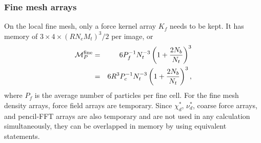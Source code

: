 \documentclass[10pt,twocolumn,reprint]{emulateapj}
\begin{document}
\subsubsection{Fine mesh arrays}
On the local fine mesh, only a force kernel array $K_f$ needs to be kept. It has memory of $3\times 4\times(RN_e M_t)^3/2$ per image, or
\begin{eqnarray}\label{eq.Mp_fine}
\nonumber	\mathcal{M}_P^{\rm fine}&=&6 P_f^{-1} N_t^{-3} \left ( 1+\frac{2N_b}{N_t} \right )^3 \\
					 &=& 6 R^3 P_c^{-1} N_t^{-3} \left ( 1+\frac{2N_b}{N_t} \right )^3,
\end{eqnarray}
where $P_f$ is the average number of particles per fine cell. For the fine mesh density arrays, force field arrays are temporary. Since $\chi_d^*$, $\nu_d^*$, coarse force arrays, and pencil-FFT arrays are also temporary and are not used in any calculation simultaneously, they can be overlapped in memory by using equivalent statements.
\end{document}
